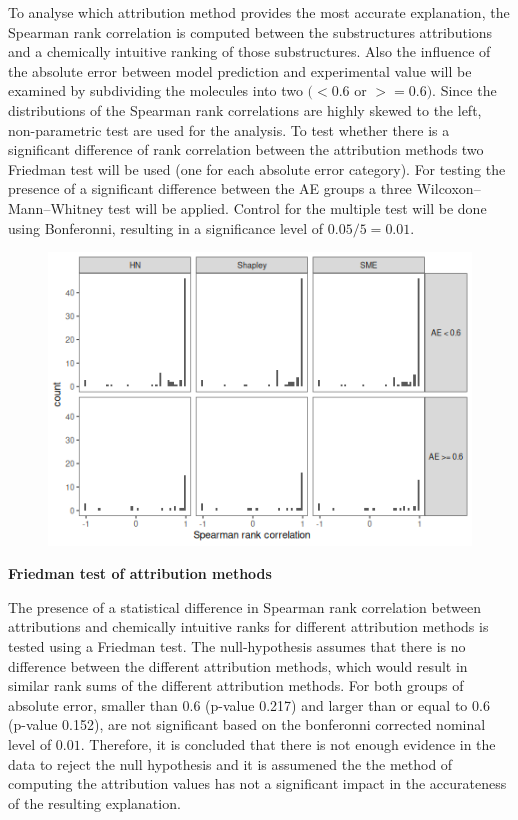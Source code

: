 To analyse which attribution method provides the most accurate
explanation, the Spearman rank correlation is computed between the
substructures attributions and a chemically intuitive ranking of those
substructures. Also the influence of the absolute error between model
prediction and experimental value will be examined by subdividing the
molecules into two \((<0.6\) or \(>=0.6)\). Since the distributions of
the Spearman rank correlations are highly skewed to the left,
non-parametric test are used for the analysis. To test whether there is
a significant difference of rank correlation between the attribution
methods two Friedman test will be used (one for each absolute error
category). For testing the presence of a significant difference between
the AE groups a three Wilcoxon--Mann--Whitney test will be applied.
Control for the multiple test will be done using Bonferonni, resulting
in a significance level of \(0.05/5 = 0.01\).


\begin{figure}[H]
    \includegraphics[scale=0.5]{./distributions-1.png}
\end{figure}


\textbf{Friedman test of attribution methods}
\label{friedman-test-of-attribution-methods}


The presence of a statistical difference in Spearman rank correlation
between attributions and chemically intuitive ranks for different
attribution methods is tested using a Friedman test. The null-hypothesis
assumes that there is no difference between the different attribution
methods, which would result in similar rank sums of the different
attribution methods. For both groups of absolute error, smaller than
\(0.6\) (p-value 0.217) and larger than or equal to \(0.6\) (p-value
0.152), are not significant based on the bonferonni corrected nominal
level of \(0.01\). Therefore, it is concluded that there is not enough
evidence in the data to reject the null hypothesis and it is assumened
the the method of computing the attribution values has not a significant
impact in the accurateness of the resulting explanation.


